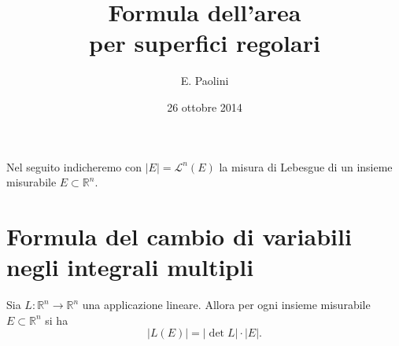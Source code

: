\documentclass[italian,a4paper]{scrartcl}
\title{Formula dell'area\\per superfici regolari}
\author{E. Paolini}
\date{26 ottobre 2014}
\newcommand{\RR}{{\mathbb R}}
\begin{document}
\maketitle

Nel seguito indicheremo con $\lvert E \rvert = \mathcal L^n(E)$ la
misura di Lebesgue di un insieme misurabile $E\subset \RR^n$. 

\section{Formula del cambio di variabili negli integrali multipli}

\begin{theorem}
Sia $L\colon \RR^n \to \RR^n$ una applicazione lineare. Allora per
ogni insieme misurabile $E\subset \RR^n$ si ha
\[
  \lvert L(E) \rvert = \lvert \det L \rvert \cdot \lvert E\rvert.
\]
\end{theorem}
\end{document}
